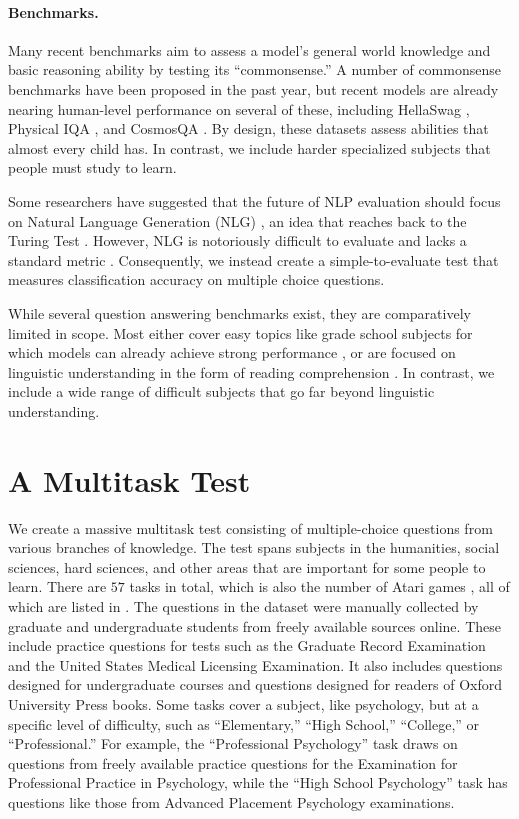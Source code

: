 \paragraph{Benchmarks.} 
Many recent benchmarks aim to assess a model's general world knowledge and basic reasoning ability by testing its ``commonsense.'' A number of commonsense benchmarks have been proposed in the past year, but recent models are already nearing human-level performance on several of these, including HellaSwag \citep{zellers2019hellaswag}, Physical IQA \citep{bisk2019physicaliqa}, and CosmosQA \citep{huang2019cosmosqa}. By design, these datasets assess abilities that almost every child has. In contrast, we include harder specialized subjects that people must study to learn. 

Some researchers have suggested that the future of NLP evaluation should focus on Natural Language Generation (NLG) \citep{zellers2020turingadvice}, an idea that reaches back to the Turing Test \citep{Turing1990TuringTest}. However, NLG is notoriously difficult to evaluate and lacks a standard metric \citep{Sai2020NLGSurvey}. Consequently, we instead create a simple-to-evaluate test that measures classification accuracy on multiple choice questions.

While several question answering benchmarks exist, they are comparatively limited in scope. Most either cover easy topics like grade school subjects for which models can already achieve strong performance \citep{Clark2018ARCAI2, khot2019qasc, OpenBookQA2018,Clark2019RegentsScienceExams}, or are focused on linguistic understanding in the form of reading comprehension \citep{lai2017race, richardson-etal-2013-mctest}. In contrast, we include a wide range of difficult subjects that go far beyond linguistic understanding.

\section{A Multitask Test}

We create a massive multitask test consisting of multiple-choice questions from various branches of knowledge.
The test spans subjects in the humanities, social sciences, hard sciences, and other areas that are important for some people to learn. 
There are $57$ tasks in total, 
which is also the number of Atari games \citep{Bellemare2013Atari}, 
all of which are listed in .
The questions in the dataset were manually collected by graduate and undergraduate students from freely available sources online. These include practice questions for tests such as the Graduate Record Examination and the United States Medical Licensing Examination. It also includes questions designed for undergraduate courses and questions designed for readers of Oxford University Press books. 
Some tasks cover a subject, like psychology, but at a specific level of difficulty, such as ``Elementary,'' ``High School,'' ``College,'' or ``Professional.''
For example, the ``Professional Psychology'' task draws on questions from freely available practice questions for the Examination for Professional Practice in Psychology, while the ``High School Psychology'' task has questions like those from Advanced Placement Psychology examinations.


